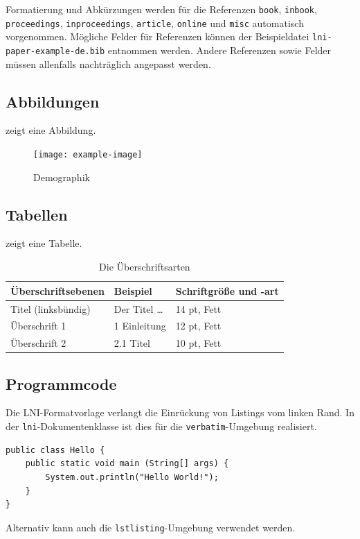 \documentclass[utf8,biblatex]{lni}
\begin{document}
Formatierung und Abkürzungen werden für die Referenzen \texttt{book}, \texttt{inbook}, \texttt{proceedings}, \texttt{inproceedings}, \texttt{article}, \texttt{online} und \texttt{misc} automatisch vorgenommen.
Mögliche Felder für Referenzen können der Beispieldatei \texttt{lni-paper-example-de.bib} entnommen werden.
Andere Referenzen sowie Felder müssen allenfalls nachträglich angepasst werden.

\subsection{Abbildungen}
 zeigt eine Abbildung.

\begin{figure}
  \centering
  \texttt{[image: example-image]}
  \caption{Demographik}
  \label{fig:demo}
\end{figure}

\subsection{Tabellen}
 zeigt eine Tabelle.

\begin{table}
\centering
\begin{tabular}{lll}
\toprule
Überschriftsebenen & Beispiel & Schriftgröße und -art \\
\midrule
Titel (linksbündig) & Der Titel \ldots & 14 pt, Fett\\
Überschrift 1 & 1 Einleitung & 12 pt, Fett\\
Überschrift 2 & 2.1 Titel & 10 pt, Fett\\
\bottomrule
\end{tabular}
\caption{Die Überschriftsarten}
\label{tab:demo}
\end{table}

\subsection{Programmcode}
Die LNI-Formatvorlage verlangt die Einrückung von Listings vom linken Rand.
In der \texttt{lni}-Dokumentenklasse ist dies für die \texttt{verbatim}-Umgebung realisiert.

\begin{verbatim}
public class Hello {
    public static void main (String[] args) {
        System.out.println("Hello World!");
    }
}
\end{verbatim}

Alternativ kann auch die \texttt{lstlisting}-Umgebung verwendet werden.
\end{document}
